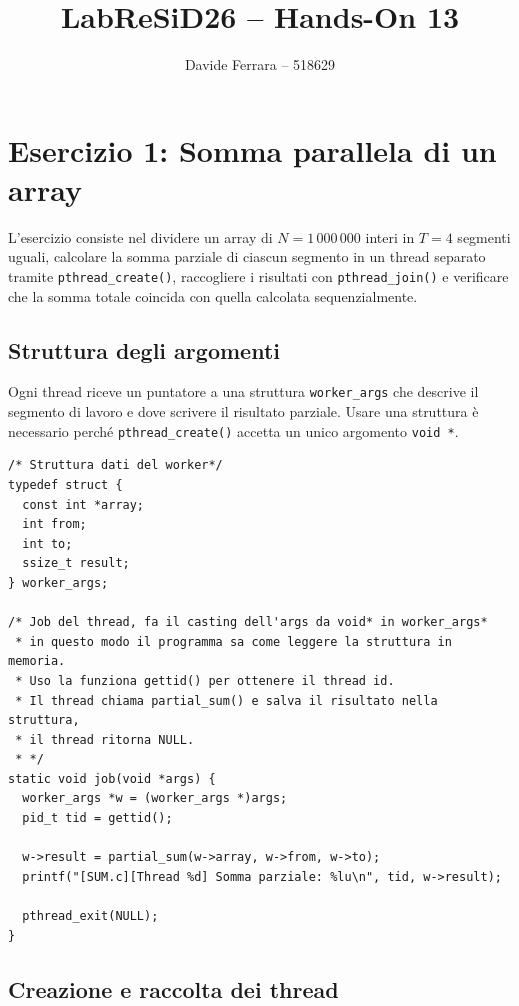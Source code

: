 \documentclass[a4paper,12pt]{article}
\title{LabReSiD26 -- Hands-On 13}
\author{Davide Ferrara -- 518629}
\date{}
\begin{document}
\maketitle

\section{Esercizio 1: Somma parallela di un array}

L'esercizio consiste nel dividere un array di $N = 1\,000\,000$ interi in
$T = 4$ segmenti uguali, calcolare la somma parziale di ciascun segmento
in un thread separato tramite \texttt{pthread\_create()}, raccogliere i
risultati con \texttt{pthread\_join()} e verificare che la somma totale
coincida con quella calcolata sequenzialmente.

\subsection*{Struttura degli argomenti}

Ogni thread riceve un puntatore a una struttura \texttt{worker\_args} che
descrive il segmento di lavoro e dove scrivere il risultato parziale.
Usare una struttura è necessario perché \texttt{pthread\_create()} accetta
un unico argomento \texttt{void *}.

\begin{lstlisting}[caption={Struttura argomento thread e funzione job}]
/* Struttura dati del worker*/
typedef struct {
  const int *array;
  int from;
  int to;
  ssize_t result;
} worker_args;

/* Job del thread, fa il casting dell'args da void* in worker_args*
 * in questo modo il programma sa come leggere la struttura in memoria.
 * Uso la funziona gettid() per ottenere il thread id.
 * Il thread chiama partial_sum() e salva il risultato nella struttura,
 * il thread ritorna NULL.
 * */
static void job(void *args) {
  worker_args *w = (worker_args *)args;
  pid_t tid = gettid();

  w->result = partial_sum(w->array, w->from, w->to);
  printf("[SUM.c][Thread %d] Somma parziale: %lu\n", tid, w->result);

  pthread_exit(NULL);
}
\end{lstlisting}

\subsection*{Creazione e raccolta dei thread}
\end{document}
